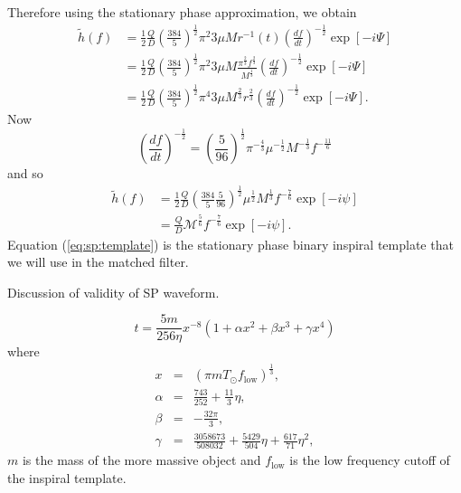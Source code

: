 Therefore using the stationary phase approximation, we obtain
\begin{align}
\tilde{h}(f) &= \frac{1}{2} \frac{Q}{D} \left(\frac{384}{5}\right)^\frac{1}{2} \pi^{2}{3} \mu M
                r^{-1}(t) \left(\frac{df}{dt}\right)^{-\frac{1}{2}} \exp\left[-i \Psi\right] \\
             &= \frac{1}{2} \frac{Q}{D} \left(\frac{384}{5}\right)^\frac{1}{2} \pi^{2}{3} \mu M
                \frac{\pi^\frac{2}{3} f^\frac{2}{3}}{M^\frac{1}{3}}
                \left(\frac{df}{dt}\right)^{-\frac{1}{2}} \exp\left[-i \Psi\right] \\
             &= \frac{1}{2} \frac{Q}{D} \left(\frac{384}{5}\right)^\frac{1}{2} \pi^{4}{3} \mu
                M^\frac{2}{3} r^\frac{2}{3}
                \left(\frac{df}{dt}\right)^{-\frac{1}{2}} \exp\left[-i \Psi\right].
\end{align}
Now
\begin{equation}
\left(\frac{df}{dt}\right)^{-\frac{1}{2}} =
\left(\frac{5}{96}\right)^\frac{1}{2} \pi^{-\frac{4}{3}} 
\mu^{-\frac{1}{2}} M^{-\frac{1}{3}} f^{-\frac{11}{6}}
\end{equation}
and so 
\begin{align}
\tilde{h}(f) &= \frac{1}{2} \frac{Q}{D} \left(\frac{384}{5} \frac{5}{96}\right)^\frac{1}{2}
                \mu^\frac{1}{2} M^\frac{1}{3} f^{-\frac{7}{6}} \exp\left[-i \psi\right] \\
             &= \frac{Q}{D} \mathcal{M}^\frac{5}{6} f^{-\frac{7}{6}} \exp\left[-i \psi\right].
             \label{eq:sp:template}
\end{align}
Equation (\ref{eq:sp:template}) is the stationary phase binary inspiral
template that we will use in the matched filter.

Discussion of validity of SP waveform.

\begin{equation}
t = \frac{5m}{256\eta} 
  x^{-8}\left(1 + \alpha x^2 + \beta x^3 + \gamma x^4 \right)
 \label{eq:chirplength}
\end{equation}
where
\begin{eqnarray}
x & = & \left(\pi m T_\odot f_{\mathrm{low}}\right)^{\frac{1}{3}}, \\
\alpha & = & \frac{743}{252} + \frac{11}{3}\eta, \\
\beta & = & -\frac{32\pi}{3}, \\
\gamma & = & \frac{3058673}{508032}+\frac{5429}{504}\eta+\frac{617}{71}\eta^2,
\end{eqnarray}
$m$ is the mass of the more massive object and $f_{\mathrm{low}}$ is the low
frequency cutoff of the inspiral template.

